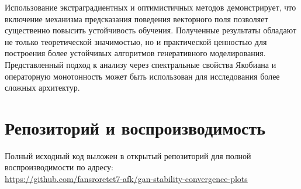 \documentclass[12pt,a4paper]{article}
\begin{document}
	Использование экстраградиентных и оптимистичных методов демонстрирует, что включение механизма предсказания поведения векторного поля позволяет существенно повысить устойчивость обучения.
	Полученные результаты обладают не только теоретической значимостью, но и практической ценностью для построения более устойчивых алгоритмов генеративного моделирования. Представленный подход к анализу через спектральные свойства Якобиана и операторную монотонность может быть использован для исследования более сложных архитектур.
	\section{Репозиторий и воспроизводимость}
	Полный исходный код  выложен в открытый репозиторий для полной воспроизводимости по адресу: \\
	\url{https://github.com/fansroretet7-afk/gan-stability-convergence-plots}
	
\end{document}
